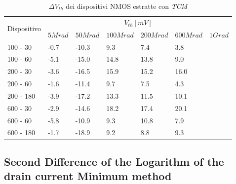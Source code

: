 \documentclass[12pt, letterpaper]{book}
\begin{document}
\begin{table}[H]
  \renewcommand{\arraystretch}{1.3}
  \begin{tabular}{m{2cm}  m{1.1cm} m{1.3cm} m{1.5cm} m{1.5cm} m{1.5cm} m{1cm}}
    \toprule
    \multirow{2}{*}{Dispositivo} & \multicolumn{6}{c}{$V_{th} [mV] $}                                                          \\
    \cmidrule{2-7}
                                 & $5Mrad$                            & $50Mrad$ & $100Mrad$ & $200Mrad$ & $600Mrad$ & $1Grad$ \\
    \midrule
    100 - 30                     & -0.7                               & -10.3    & 9.3       & 7.4       & 3.8       &         \\
    \hline
    100 - 60                     & -5.1                               & -15.0    & 14.8      & 13.8      & 9.0       &         \\
    \hline
    200 - 30                     & -3.6                               & -16.5    & 15.9      & 15.2      & 16.0      &         \\
    \hline
    200 - 60                     & -1.6                               & -11.4    & 9.7       & 7.5       & 4.3       &         \\
    \hline
    200 - 180                    & -3.9                               & -17.2    & 13.3      & 11.5      & 10.1      &         \\
    \hline
    600 - 30                     & -2.9                               & -14.6    & 18.2      & 17.4      & 20.1      &         \\
    \hline
    600 - 60                     & -5.8                               & -10.9    & 9.3       & 10.8      & 7.9       &         \\
    \hline
    600 - 180                    & -1.7                               & -18.9    & 9.2       & 8.8       & 9.3       &         \\
    \bottomrule
  \end{tabular}
  \caption{$\Delta V_{th}$ dei dispositivi NMOS estratte con \emph{TCM}}
  \label{tab:deltaVthTCMN}
\end{table}








\subsection{Second Difference of the Logarithm of the drain current Minimum method}
\end{document}
